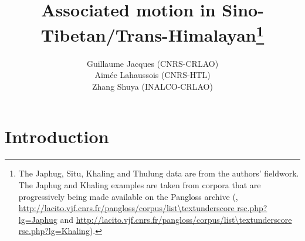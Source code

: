 \documentclass[oneside,a4paper,11pt]{article}
\begin{document}
 
\title{Associated motion in Sino-Tibetan/Trans-Himalayan\footnote{The Japhug, Situ, Khaling and Thulung data are from the authors' fieldwork. The Japhug and Khaling examples are taken from corpora that are progressively being made available on the Pangloss archive (\citealt{michailovsky14pangloss},  
 \url{http://lacito.vjf.cnrs.fr/pangloss/corpus/list\textunderscore rsc.php?lg=Japhug} and  \url{http://lacito.vjf.cnrs.fr/pangloss/corpus/list\textunderscore rsc.php?lg=Khaling}).}}
\author{Guillaume Jacques (CNRS-CRLAO)\\ Aimée Lahaussois (CNRS-HTL) \\ Zhang Shuya (INALCO-CRLAO)}
\maketitle
%
%
%


\section{Introduction}
\end{document}

